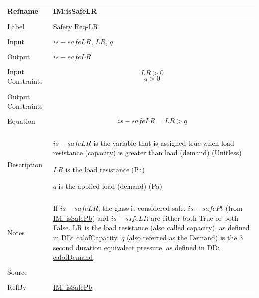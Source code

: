 \documentclass[12pt]{article}
\begin{document}
\noindent \begin{minipage}{\textwidth}
\begin{tabular}{p{} p{}}
\toprule \textbf{Refname} & \textbf{IM:isSafeLR}
\label{IM:isSafeLR}
\\ \midrule \\
Label & Safety Req-LR
\\ \midrule \\
Input & $is-safeLR$, $LR$, $q$
\\ \midrule \\
Output & $is-safeLR$
\\ \midrule \\
Input Constraints & \begin{displaymath}
                    LR>0
                    \end{displaymath}
                    \begin{displaymath}
                    q>0
                    \end{displaymath}
\\ \midrule \\
Output Constraints & 
\\ \midrule \\
Equation & \begin{displaymath}
           is-safeLR=LR>q
           \end{displaymath}
\\ \midrule \\
Description & \begin{symbDescription}
              \item{$is-safeLR$ is the variable that is assigned true when load resistance (capacity) is greater than load (demand) (Unitless)}
              \item{$LR$ is the load resistance (Pa)}
              \item{$q$ is the applied load (demand) (Pa)}
              \end{symbDescription}
\\ \midrule \\
Notes & If $is-safeLR$, the glass is considered safe. $is-safePb$ (from \hyperref[IM:isSafePb]{IM: isSafePb}) and $is-safeLR$ are either both True or both False. LR is the load resistance (also called capacity), as defined in \hyperref[DD:calofCapacity]{DD: calofCapacity}. $q$ (also referred as the Demand) is the 3 second duration equivalent pressure, as defined in \hyperref[DD:calofDemand]{DD: calofDemand}.
\\ \midrule \\
Source & \cite{astm2009}
\\ \midrule \\
RefBy & \hyperref[IM:isSafePb]{IM: isSafePb}
\\ \bottomrule \end{tabular}
\end{minipage}
\end{document}
